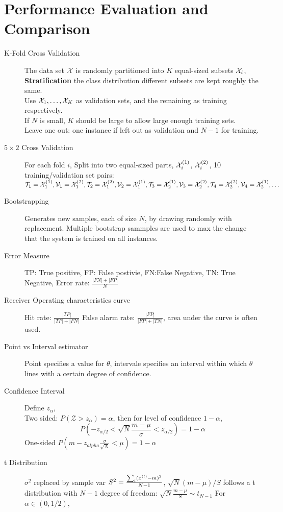 \chapter{Performance Evaluation and Comparison}
\begin{description}
    \item[K-Fold Cross Validation] The data set $\mathcal{X}$ is randomly partitioned
        into $K$ equal-sized subsets $\mathcal{X}_i$, \textbf{Stratification} the class
        distribution different subsets are kept roughly the same.\\
        Use $\mathcal{X}_1, \dots, \mathcal{X}_K$ as validation sets, and the remaining as
        training respectively.\\
        If $N$ is small, $K$ should be large to allow large
        enough training sets. \\
        Leave one out: one instance if left out as validation and $N-1$ for
        training.
    \item[$5\times 2$ Cross Validation] For each fold $i$, Split into two equal-sized parts,
        $\mathcal{X}_i^{(1)}$, $\mathcal{X}_i^{(2)}$, 10 training/validation set pairs: $\mathcal{T}_1 =
        \mathcal{X}_1^{(1)}, \mathcal{V}_1 = \mathcal{X}_1^{(2)}, \mathcal{T}_2 = \mathcal{X}_1^{(2)}, \mathcal{V}_2 =
        \mathcal{X}_1^{(1)}, \mathcal{T}_3 = \mathcal{X}_2^{(1)}, \mathcal{V}_3 = \mathcal{X}_2^{(2)}, \mathcal{T}_4 =
        \mathcal{X}_2^{(2)}, \mathcal{V}_4 = \mathcal{X}_2^{(1)}, \dots$
    \item[Bootstrapping] Generates new samples, each of size $N$, by drawing
        randomly with replacement. Multiple bootstrap sammples are used to max the
        change that the system is trained on all instances.
    \item[Error Measure] TP: True positive, FP: False postivie, FN:False
        Negative, TN: True Negative, Error rate:
        $\frac{|FN|+|FP|}{N}$
    \item[Receiver Operating characteristics curve] Hit rate:
        $\frac{|TP|}{|TP|+|FN|}$ False alarm rate: $\frac{|FP|}{|FP|+|TN|}$,
        area under the curve is often used.
    \item[Point vs Interval estimator] Point specifies a value for $\theta$,
        intervale specifies an interval within which $\theta$ lines with a
        certain degree of confidence.
    \item[Confidence Interval] Define $z_{\alpha}$,\\
        Two sided:
        $P(\mathcal{Z}>z_{\alpha}) = \alpha$, then for level of confidence
        $1-\alpha$, \[P(-z_{\alpha/2}<\sqrt{N}\frac{m-\mu}{\sigma}<z_{\alpha/2})
        = 1-\alpha\]
        One-sided $P(m-z_{alpha}\frac{\sigma}{\sqrt{N}}<\mu) = 1-\alpha$
    \item[t Distribution] $\sigma^2$ replaced by sample var $S^2 = \frac{\sum_l
        (x^{(l)} - m)^2}{N-1}$, $\sqrt{N}(m-\mu)/S$ follows a t distribution with
        $N-1$ degree of freedom: $\sqrt{N}\frac{m-\mu}{S} \sim t_{N-1}$
        For $\alpha\in(0,1/2)$, 


\end{description}
